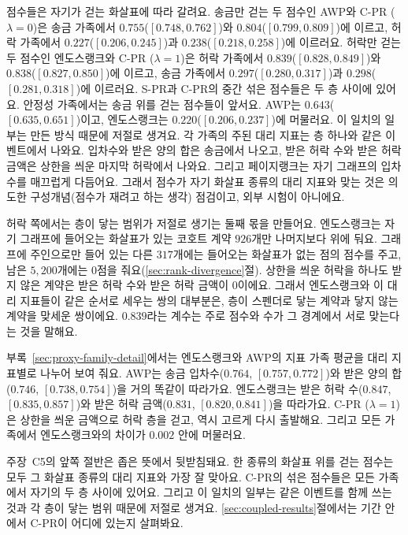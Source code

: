 

점수들은 자기가 걷는 화살표에 따라 갈려요. 송금만 걷는 두 점수인 AWP와 \mbox{C-PR} ($\lambda=0$)은 송금 가족에서 $0.755$($[0.748,0.762]$)와 $0.804$($[0.799,0.809]$)에 이르고, 허락 가족에서 $0.227$($[0.206,0.245]$)과 $0.238$($[0.218,0.258]$)에 이르러요. 허락만 걷는 두 점수인 엔도스랭크와 \mbox{C-PR} ($\lambda=1$)은 허락 가족에서 $0.839$($[0.828,0.849]$)와 $0.838$($[0.827,0.850]$)에 이르고, 송금 가족에서 $0.297$($[0.280,0.317]$)과 $0.298$($[0.281,0.318]$)에 이르러요. \mbox{S-PR}과 \mbox{C-PR}의 중간 섞은 점수들은 두 층 사이에 있어요. 안정성 가족에서는 송금 위를 걷는 점수들이 앞서요. AWP는 $0.643$($[0.635,0.651]$)이고, 엔도스랭크는 $0.220$($[0.206,0.237]$)에 머물러요. 이 일치의 일부는 만든 방식 때문에 저절로 생겨요. 각 가족의 주된 대리 지표는 층 하나와 같은 이벤트에서 나와요. 입차수와 받은 양의 합은 송금에서 나오고, 받은 허락 수와 받은 허락 금액은 상한을 씌운 마지막 허락에서 나와요. 그리고 페이지랭크는 자기 그래프의 입차수를 매끄럽게 다듬어요. 그래서 점수가 자기 화살표 종류의 대리 지표와 맞는 것은 의도한 구성개념(점수가 재려고 하는 생각) 점검이고, 외부 시험이 아니에요.

허락 쪽에서는 층이 닿는 범위가 저절로 생기는 둘째 몫을 만들어요. 엔도스랭크는 자기 그래프에 들어오는 화살표가 있는 코호트 계약 $926$개만 나머지보다 위에 둬요. 그래프에 주인으로만 들어 있는 다른 $317$개에는 들어오는 화살표가 없는 점의 점수를 주고, 남은 $5{,}200$개에는 0점을 줘요(\ref{sec:rank-divergence}절). 상한을 씌운 허락을 하나도 받지 않은 계약은 받은 허락 수와 받은 허락 금액이 0이에요. 그래서 엔도스랭크와 이 대리 지표들이 같은 순서로 세우는 쌍의 대부분은, 층이 스펜더로 닿는 계약과 닿지 않는 계약을 맞세운 쌍이에요. $0.839$라는 계수는 주로 점수와 수가 그 경계에서 서로 맞는다는 것을 말해요.

부록~\ref{sec:proxy-family-detail}에서는 엔도스랭크와 AWP의 지표 가족 평균을 대리 지표별로 나누어 보여 줘요. AWP는 송금 입차수($0.764$, $[0.757,0.772]$)와 받은 양의 합($0.746$, $[0.738,0.754]$)을 거의 똑같이 따라가요. 엔도스랭크는 받은 허락 수($0.847$, $[0.835,0.857]$)와 받은 허락 금액($0.831$, $[0.820,0.841]$)을 따라가요. \mbox{C-PR} ($\lambda=1$)은 상한을 씌운 금액으로 허락 층을 걷고, 역시 고르게 다시 출발해요. 그리고 모든 가족에서 엔도스랭크와의 차이가 $0.002$ 안에 머물러요.

주장~C5의 앞쪽 절반은 좁은 뜻에서 뒷받침돼요. 한 종류의 화살표 위를 걷는 점수는 모두 그 화살표 종류의 대리 지표와 가장 잘 맞아요. \mbox{C-PR}의 섞은 점수들은 모든 가족에서 자기의 두 층 사이에 있어요. 그리고 이 일치의 일부는 같은 이벤트를 함께 쓰는 것과 각 층이 닿는 범위 때문에 저절로 생겨요. \ref{sec:coupled-results}절에서는 기간 안에서 \mbox{C-PR}이 어디에 있는지 살펴봐요.

